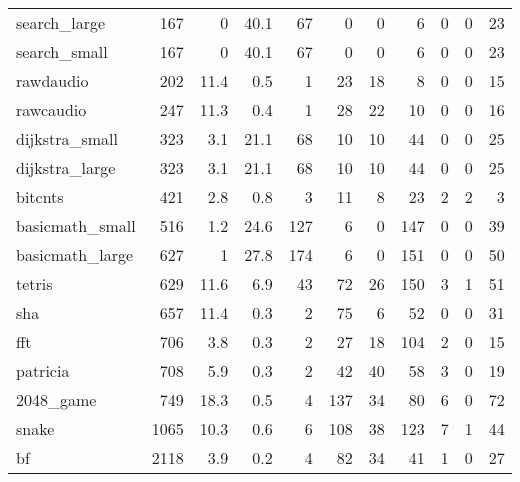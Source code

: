 \begin{tabular}{lrrrrrrrrrr}
 search\_large    &            167 &      0   &   40.1 &   67 &      0 &          0 &            6 &     0 &     0 &    23 \\
 search\_small    &            167 &      0   &   40.1 &   67 &      0 &          0 &            6 &     0 &     0 &    23 \\
 rawdaudio       &            202 &     11.4 &    0.5 &    1 &     23 &         18 &            8 &     0 &     0 &    15 \\
 rawcaudio       &            247 &     11.3 &    0.4 &    1 &     28 &         22 &           10 &     0 &     0 &    16 \\
 dijkstra\_small  &            323 &      3.1 &   21.1 &   68 &     10 &         10 &           44 &     0 &     0 &    25 \\
 dijkstra\_large  &            323 &      3.1 &   21.1 &   68 &     10 &         10 &           44 &     0 &     0 &    25 \\
 bitcnts         &            421 &      2.8 &    0.8 &    3 &     11 &          8 &           23 &     2 &     2 &     3 \\
 basicmath\_small &            516 &      1.2 &   24.6 &  127 &      6 &          0 &          147 &     0 &     0 &    39 \\
 basicmath\_large &            627 &      1   &   27.8 &  174 &      6 &          0 &          151 &     0 &     0 &    50 \\
 tetris          &            629 &     11.6 &    6.9 &   43 &     72 &         26 &          150 &     3 &     1 &    51 \\
 sha             &            657 &     11.4 &    0.3 &    2 &     75 &          6 &           52 &     0 &     0 &    31 \\
 fft             &            706 &      3.8 &    0.3 &    2 &     27 &         18 &          104 &     2 &     0 &    15 \\
 patricia        &            708 &      5.9 &    0.3 &    2 &     42 &         40 &           58 &     3 &     0 &    19 \\
 2048\_game       &            749 &     18.3 &    0.5 &    4 &    137 &         34 &           80 &     6 &     0 &    72 \\
 snake           &           1065 &     10.3 &    0.6 &    6 &    108 &         38 &          123 &     7 &     1 &    44 \\
 bf              &           2118 &      3.9 &    0.2 &    4 &     82 &         34 &           41 &     1 &     0 &    27 \\

\end{tabular}
